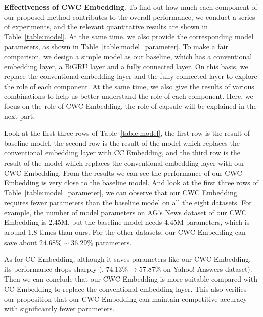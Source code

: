 \documentclass[times,twocolumn,final]{elsarticle}
\begin{document}
\noindent\textbf{Effectiveness of CWC Embedding}. To find out how much each component of our proposed method contributes to the overall performance, we conduct a series of experiments, and the relevant quantitative results are shown in Table~\ref{table:model}. At the same time, we also provide the corresponding model parameters, as shown in Table~\ref{table:model_parameter}. To make a fair comparison, we design a simple model as our baseline, which has a conventional embedding layer, a BiGRU layer and a fully connected layer. On this basis, we replace the conventional embedding layer and the fully connected layer to explore the role of each component. At the same time, we also give the results of various combinations to help us better understand the role of each component. Here, we focus on the role of CWC Embedding, the role of capsule will be explained in the next part.

Look at the first three rows of Table~\ref{table:model}, the first row is the result of baseline model, the second row is the result of the model which replaces the conventional embedding layer with CC Embedding, and the third row is the result of the model which replaces the conventional embedding layer with our CWC Embedding. From the results we can see the performance of our CWC Embedding is very close to the baseline model. And look at the first three rows of Table~\ref{table:model_parameter}, we can observe that our CWC Embedding requires fewer parameters than the baseline model on all the eight datasets. For example, the number of model parameters on AG's News dataset of our CWC Embedding is 2.45M, but the baseline model needs 4.45M parameters, which is around 1.8 times than ours. For the other datasets, our CWC Embedding can save about $24.68\% \sim 36.29\% $ parameters. 

As for CC Embedding, although it saves parameters like our CWC Embedding, its performance drops sharply (\ie, $74.13\% \rightarrow 57.87\%$ on Yahoo! Answers dataset). Then we can conclude that our CWC Embedding is more suitable compared with CC Embedding to replace the conventional embedding layer. This also verifies our proposition that our CWC Embedding can maintain competitive accuracy with significantly fewer parameters.
\end{document}
